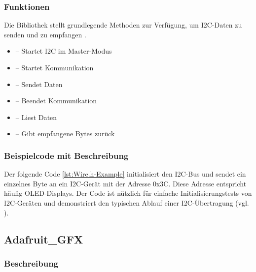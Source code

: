 \subsubsection{Funktionen}

Die Bibliothek stellt grundlegende Methoden zur Verfügung, um I2C-Daten zu senden und zu empfangen \cite{Arduino:2024Wire}.

\begin{itemize}
    \item {} – Startet I2C im Master-Modus
    
    \item {} – Startet Kommunikation
    
    \item {} – Sendet Daten
    
    \item {} – Beendet Kommunikation
    
    \item {} – Liest Daten
    
    \item {} – Gibt empfangene Bytes zurück
\end{itemize}

\subsubsection{Beispielcode mit Beschreibung}

Der folgende Code \ref{lst:Wire.h-Example} initialisiert den I2C-Bus und sendet ein einzelnes Byte an ein I2C-Gerät mit der Adresse 0x3C. Diese Adresse entspricht häufig OLED-Displays. Der Code ist nützlich für einfache Initialisierungstests von I2C-Geräten und demonstriert den typischen Ablauf einer I2C-Übertragung (vgl. \cite{Arduino:2024Wire}).

{
    \label{lst:Wire.h-Example}
}

\subsection{Adafruit\_GFX}

\subsubsection{Beschreibung}

